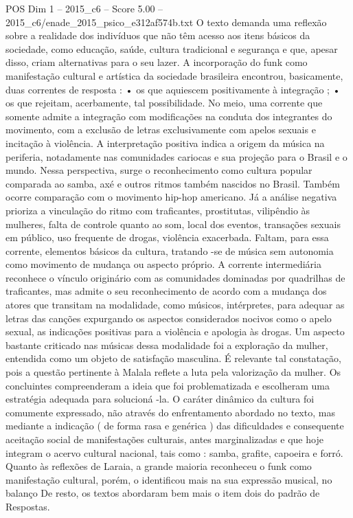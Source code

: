\begin{textsample}{POS Dim 1 – 2015\_c6 – Score 5.00 – 2015\_c6/enade\_2015\_psico\_e312af574b.txt}
O texto demanda uma reflexão sobre a realidade dos indivíduos que não têm acesso aos itens básicos da sociedade, como educação, saúde, cultura tradicional e segurança e que, apesar disso, criam alternativas para o seu lazer.
A incorporação do funk como manifestação cultural e artística da sociedade brasileira encontrou, basicamente, duas correntes de resposta : • os que aquiescem positivamente à integração ; • os que rejeitam, acerbamente, tal possibilidade.
No meio, uma corrente que somente admite a integração com modificações na conduta dos integrantes do movimento, com a exclusão de letras exclusivamente com apelos sexuais e incitação à violência.
A interpretação positiva indica a origem da música na periferia, notadamente nas comunidades cariocas e sua projeção para o Brasil e o mundo.
Nessa perspectiva, surge o reconhecimento como cultura popular comparada ao samba, axé e outros ritmos também nascidos no Brasil.
Também ocorre comparação com o movimento hip-hop americano.
Já a análise negativa prioriza a vinculação do ritmo com traficantes, prostitutas, vilipêndio às mulheres, falta de controle quanto ao som, local dos eventos, transações sexuais em público, uso frequente de drogas, violência exacerbada.
Faltam, para essa corrente, elementos básicos da cultura, tratando -se de música sem autonomia como movimento de mudança ou aspecto próprio.
A corrente intermediária reconhece o vínculo originário com as comunidades dominadas por quadrilhas de traficantes, mas admite o seu reconhecimento de acordo com a mudança dos atores que transitam na modalidade, como músicos, intérpretes, para adequar as letras das canções expurgando os aspectos considerados nocivos como o apelo sexual, as indicações positivas para a violência e apologia às drogas.
Um aspecto bastante criticado nas músicas dessa modalidade foi a exploração da mulher, entendida como um objeto de satisfação masculina.
É relevante tal constatação, pois a questão pertinente à Malala reflete a luta pela valorização da mulher.
Os concluintes compreenderam a ideia que foi problematizada e escolheram uma estratégia adequada para solucioná -la.
O caráter dinâmico da cultura foi comumente expressado, não através do enfrentamento abordado no texto, mas mediante a indicação ( de forma rasa e genérica ) das dificuldades e consequente aceitação social de manifestações culturais, antes marginalizadas e que hoje integram o acervo cultural nacional, tais como : samba, grafite, capoeira e forró.
Quanto às reflexões de Laraia, a grande maioria reconheceu o funk como manifestação cultural, porém, o identificou mais na sua expressão musical, no balanço De resto, os textos abordaram bem mais o item dois do padrão de Respostas.

\end{textsample}

